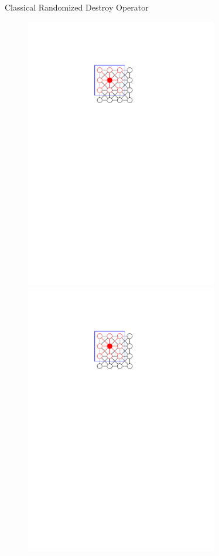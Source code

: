 \documentclass[aspectratio=1610]{beamer}
\begin{document}
\begin{frame}{Classical Randomized Destroy Operator}
\begin{figure}
\begin{overprint}
			\centering\includegraphics[width=0.75\textwidth, page=14]{graphics/graphics.pdf}
			\onslide<3>\centering\includegraphics[width=0.75\textwidth, page=15]{graphics/graphics.pdf}

\end{overprint}
\end{figure}
\end{frame}
\end{document}
